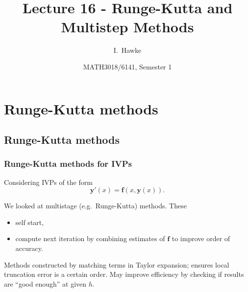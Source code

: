 \documentclass{beamer}
\title[Lecture 16] %
{Lecture 16 - Runge-Kutta and Multistep Methods}
\author[I. Hawke] %
{I.~Hawke}
\institute[University of Southampton] %
{
  School of Mathematics, \\
  University of Southampton, UK
}
\date[Semester 1] %
{MATH3018/6141, Semester 1}
\newcommand{\by}{{\boldsymbol{y}}}
\newcommand{\bfm}[1]{{\boldsymbol{#1}}}
\begin{document}
\begin{frame}
  \titlepage
\end{frame}

\section{Runge-Kutta methods}

\subsection{Runge-Kutta methods}

\begin{frame}
  \frametitle{Runge-Kutta methods for IVPs}

  Considering IVPs of the form
  \begin{equation*}
    \by'(x) = \bfm{f}(x, \by(x)).
  \end{equation*}

  We looked at multistage (e.g.\ Runge-Kutta) methods. These
  \begin{itemize}
  \item self start,
  \item  compute next iteration by combining estimates of $\bfm{f}$ to
    improve order of accuracy.
  \end{itemize} \pause

  \vspace{1ex}

  Methods constructed by matching terms in Taylor expansion; ensures
  local truncation error is a certain order. May improve efficiency by
  checking if results are ``good enough'' at given $h$.

\end{frame}
\end{document}
